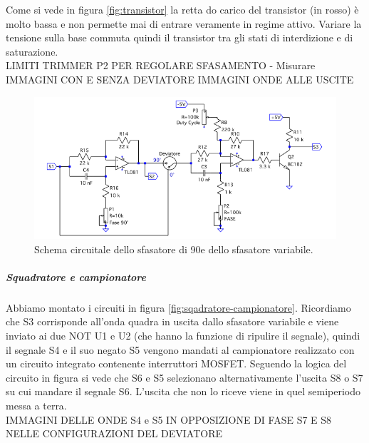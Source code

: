 \documentclass[10pt,a4paper]{article}
\begin{document}
Come si vede in figura \ref{fig:transistor} la retta do carico del transistor (in rosso) è molto bassa e non permette mai di entrare veramente in regime attivo. Variare la tensione sulla base commuta quindi il transistor tra gli stati di interdizione e di saturazione.\\


LIMITI TRIMMER P2 PER REGOLARE SFASAMENTO - Misurare
IMMAGINI CON E SENZA DEVIATORE 
IMMAGINI ONDE ALLE USCITE

\begin{figure}[!htb]
  \centering
  \includegraphics[scale=0.75]{sfasatori.png}
\caption{Schema circuitale dello sfasatore di 90\degree e dello sfasatore variabile.\label{fig:sfasatori}}
\end{figure}


\subparagraph{Squadratore e campionatore}
Abbiamo montato i circuiti in figura \ref{fig:sqadratore-campionatore}. Ricordiamo che S3 corrisponde all'onda quadra in uscita dallo sfasatore variabile e viene inviato ai due NOT U1 e U2 (che hanno la funzione di ripulire il segnale), quindi il segnale S4 e il suo negato S5 vengono mandati al campionatore realizzato con un circuito integrato contenente interruttori MOSFET. Seguendo la logica del circuito in figura si vede che S6 e S5 selezionano alternativamente l'uscita S8 o S7 su cui mandare il segnale S6. L'uscita che non lo riceve viene in quel semiperiodo messa a terra.\\

IMMAGINI DELLE ONDE
S4 e S5 IN OPPOSIZIONE DI FASE
S7 E S8 NELLE CONFIGURAZIONI DEL DEVIATORE
\end{document}
